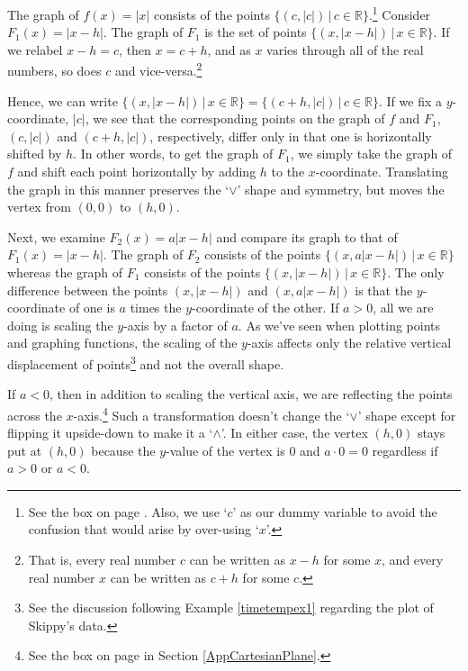 \documentclass{ximera}
\begin{document}
\medskip

The graph of $f(x) = |x|$ consists of the points $\{ (c, |c|) \, | \, c \in \mathbb R\}$.\footnote{See the box on page \pageref{waystorepresentfunctionsbox}.  Also, we use `$c$'  as our dummy variable to avoid the confusion that would arise by over-using `$x$'.}    Consider $F_{1}(x) = |x - h|$.  The graph of $F_{1}$  is the set of points $\{ (x, |x - h|) \, | \, x \in \mathbb{R} \}$.  If we relabel $x - h = c$, then $x = c + h$, and as $x$ varies through all of the real numbers, so does $c$ and vice-versa.\footnote{That is, every real number $c$ can be written as $x - h$ for some $x$, and every real number $x$ can be written as $c + h$ for some $c$.}   

\medskip

Hence, we can write $\{ (x, |x - h|) \, | \, x \in \mathbb{R} \} = \{ (c + h, |c|) \, | \, c \in \mathbb{R} \}$.    If we fix a $y$-coordinate, $|c|$,  we see that the corresponding points on the graph of $f$ and $F_{1}$,  $(c, |c|)$ and $(c + h, |c|)$, respectively, differ only in that one is horizontally shifted by $h$.   In other words, to get the graph of $F_{1}$, we simply take the graph of $f$ and shift each point horizontally by adding $h$ to the $x$-coordinate.  Translating the graph in this manner preserves the `$\vee$' shape and symmetry, but moves the vertex from $(0, 0)$ to $(h, 0)$.

\medskip

Next, we examine $F_{2}(x) = a|x - h|$ and compare its graph to that of $F_{1}(x) = |x - h|$.  The graph of $F_{2}$ consists of the points $\{ (x, a|x - h|) \, | \, x \in \mathbb{R} \}$ whereas the graph of $F_{1}$ consists of the points $\{ (x, |x - h|) \, | \, x \in \mathbb{R} \}$.  The only difference between the points $(x, |x - h|)$ and $(x, a|x - h|)$ is that the $y$-coordinate of one is $a$ times the $y$-coordinate of the other.   If $a > 0$, all we are doing is scaling the $y$-axis by a factor of $a$.  As we've seen when plotting points and graphing functions, the scaling of the $y$-axis affects only the relative vertical displacement of points\footnote{See the discussion following Example \ref{timetempex1} regarding the plot of Skippy's data.} and not the overall shape.   

\medskip

If $a < 0$, then in addition to scaling the vertical axis, we are reflecting the points across the $x$-axis.\footnote{See the box on page \pageref{reflectionsinabox} in Section \ref{AppCartesianPlane}.} Such a transformation doesn't change the `$\vee$' shape except for flipping it upside-down to make it a `$\wedge$'.  In either case, the vertex $(h, 0)$ stays put at $(h, 0)$ because the $y$-value of the vertex is $0$ and $a \cdot 0 = 0$ regardless if $a > 0$ or $a < 0$.
\end{document}

